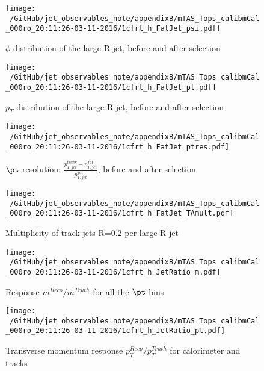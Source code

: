 \begin{figure}
 
\texttt{[image: ~/GitHub/jet\_observables\_note/appendixB/mTAS\_Tops\_calibmCal\_000ro\_20:11:26-03-11-2016/1cfrt\_h\_FatJet\_psi.pdf]}
\caption{$\phi$ distribution of the large-R jet, before and after selection}
 
\end{figure}
 
\begin{figure}
 
\texttt{[image: ~/GitHub/jet\_observables\_note/appendixB/mTAS\_Tops\_calibmCal\_000ro\_20:11:26-03-11-2016/1cfrt\_h\_FatJet\_pt.pdf]}
\caption{$p_{T}$ distribution of the large-R jet, before and after selection}
 
\end{figure}
 
\begin{figure}
 
\texttt{[image: ~/GitHub/jet\_observables\_note/appendixB/mTAS\_Tops\_calibmCal\_000ro\_20:11:26-03-11-2016/1cfrt\_h\_FatJet\_ptres.pdf]}
\caption{$\pt$ resolution: $\frac{p_{T,jet}^{track}-p_{T,jet}^{fat}}{p_{T,jet}^{fat}}$, before and after selection }
 
\end{figure}
 
\begin{figure}
 
\texttt{[image: ~/GitHub/jet\_observables\_note/appendixB/mTAS\_Tops\_calibmCal\_000ro\_20:11:26-03-11-2016/1cfrt\_h\_FatJet\_TAmult.pdf]}
\caption{Multiplicity of track-jets R=0.2 per large-R jet}
 
\end{figure}
\begin{figure}
 
\texttt{[image: ~/GitHub/jet\_observables\_note/appendixB/mTAS\_Tops\_calibmCal\_000ro\_20:11:26-03-11-2016/1cfrt\_h\_JetRatio\_m.pdf]}
\caption{Response $m^{Reco} / m^{Truth}$ for all the $\pt$ bins}
 
\end{figure}
 
\begin{figure}
 
\texttt{[image: ~/GitHub/jet\_observables\_note/appendixB/mTAS\_Tops\_calibmCal\_000ro\_20:11:26-03-11-2016/1cfrt\_h\_JetRatio\_pt.pdf]}
\caption{Transverse momentum response $p_{T}^{Reco} / p_{T}^{Truth}$ for calorimeter and tracks}
 
\end{figure}
 
